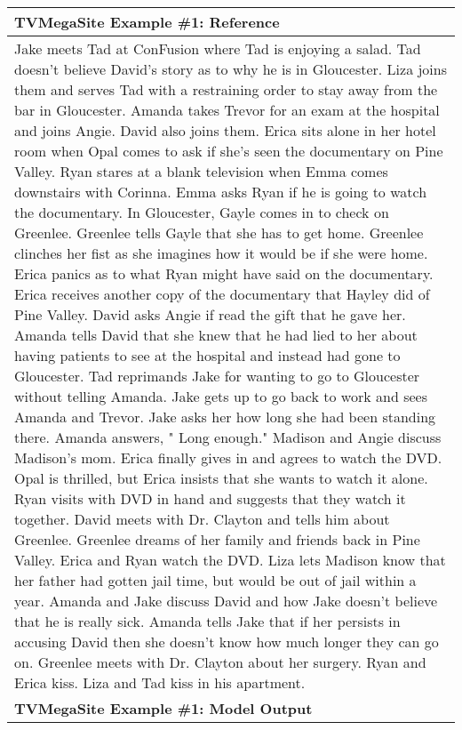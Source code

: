 \begin{table}[!htbp]
    \centering
    \tiny
    \begin{tabular}{p{\linewidth}} 
    \toprule
    \textbf{TVMegaSite Example \#1: Reference} \\
    \midrule
Jake meets Tad at ConFusion where Tad is enjoying a salad. Tad doesn't believe David's story as to why he is in Gloucester. Liza joins them and serves Tad with a restraining order to stay away from the bar in Gloucester. Amanda takes Trevor for an exam at the hospital and joins Angie. David also joins them. Erica sits alone in her hotel room when Opal comes to ask if she's seen the documentary on Pine Valley. Ryan stares at a blank television when Emma comes downstairs with Corinna. Emma asks Ryan if he is going to watch the documentary. In Gloucester, Gayle comes in to check on Greenlee. Greenlee tells Gayle that she has to get home. Greenlee clinches her fist as she imagines how it would be if she were home. Erica panics as to what Ryan might have said on the documentary. Erica receives another copy of the documentary that Hayley did of Pine Valley. David asks Angie if read the gift that he gave her. Amanda tells David that she knew that he had lied to her about having patients to see at the hospital and instead had gone to Gloucester. Tad reprimands Jake for wanting to go to Gloucester without telling Amanda. Jake gets up to go back to work and sees Amanda and Trevor. Jake asks her how long she had been standing there. Amanda answers, " Long enough." Madison and Angie discuss Madison's mom. Erica finally gives in and agrees to watch the DVD. Opal is thrilled, but Erica insists that she wants to watch it alone. Ryan visits with DVD in hand and suggests that they watch it together. David meets with Dr. Clayton and tells him about Greenlee. Greenlee dreams of her family and friends back in Pine Valley. Erica and Ryan watch the DVD. Liza lets Madison know that her father had gotten jail time, but would be out of jail within a year. Amanda and Jake discuss David and how Jake doesn't believe that he is really sick. Amanda tells Jake that if her persists in accusing David then she doesn't know how much longer they can go on. Greenlee meets with Dr. Clayton about her surgery. Ryan and Erica kiss. Liza and Tad kiss in his apartment.
    \\
    \midrule
    \textbf{TVMegaSite Example \#1: Model Output} \\
    \midrule

\end{tabular}
\end{table}
